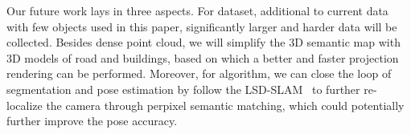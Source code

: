 \documentclass[10pt,twocolumn,letterpaper]{article}
\begin{document}
Our future work lays in three aspects. For dataset, additional to current data with few objects used in this paper, significantly larger and harder data will be collected.
Besides dense point cloud, we will simplify the 3D semantic map with 3D models of road and buildings, based on which a better and faster projection rendering can be performed. 
Moreover, for algorithm, we can close the loop of segmentation and pose estimation by follow the LSD-SLAM~\cite{engel2014lsd} to further re-localize the camera through perpixel semantic matching, which could potentially further improve the pose accuracy.



{\small


}
\end{document}
